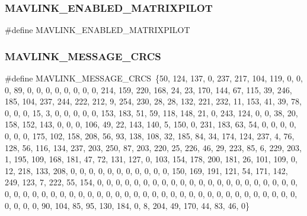\subsubsection{M\+A\+V\+L\+I\+N\+K\+\_\+\+E\+N\+A\+B\+L\+E\+D\+\_\+\+M\+A\+T\+R\+I\+X\+P\+I\+L\+OT}
{\footnotesize\ttfamily \#define M\+A\+V\+L\+I\+N\+K\+\_\+\+E\+N\+A\+B\+L\+E\+D\+\_\+\+M\+A\+T\+R\+I\+X\+P\+I\+L\+OT}

\mbox{\label{matrixpilot_8h_a3f709d5835acb54a11202a5fdc7a6bfe}} 
\subsubsection{M\+A\+V\+L\+I\+N\+K\+\_\+\+M\+E\+S\+S\+A\+G\+E\+\_\+\+C\+R\+CS}
{\footnotesize\ttfamily \#define M\+A\+V\+L\+I\+N\+K\+\_\+\+M\+E\+S\+S\+A\+G\+E\+\_\+\+C\+R\+CS~\{50, 124, 137, 0, 237, 217, 104, 119, 0, 0, 0, 89, 0, 0, 0, 0, 0, 0, 0, 0, 214, 159, 220, 168, 24, 23, 170, 144, 67, 115, 39, 246, 185, 104, 237, 244, 222, 212, 9, 254, 230, 28, 28, 132, 221, 232, 11, 153, 41, 39, 78, 0, 0, 0, 15, 3, 0, 0, 0, 0, 0, 153, 183, 51, 59, 118, 148, 21, 0, 243, 124, 0, 0, 38, 20, 158, 152, 143, 0, 0, 0, 106, 49, 22, 143, 140, 5, 150, 0, 231, 183, 63, 54, 0, 0, 0, 0, 0, 0, 0, 175, 102, 158, 208, 56, 93, 138, 108, 32, 185, 84, 34, 174, 124, 237, 4, 76, 128, 56, 116, 134, 237, 203, 250, 87, 203, 220, 25, 226, 46, 29, 223, 85, 6, 229, 203, 1, 195, 109, 168, 181, 47, 72, 131, 127, 0, 103, 154, 178, 200, 181, 26, 101, 109, 0, 12, 218, 133, 208, 0, 0, 0, 0, 0, 0, 0, 0, 0, 0, 0, 150, 169, 191, 121, 54, 171, 142, 249, 123, 7, 222, 55, 154, 0, 0, 0, 0, 0, 0, 0, 0, 0, 0, 0, 0, 0, 0, 0, 0, 0, 0, 0, 0, 0, 0, 0, 0, 0, 0, 0, 0, 0, 0, 0, 0, 0, 0, 0, 0, 0, 0, 0, 0, 0, 0, 0, 0, 0, 0, 0, 0, 0, 0, 0, 0, 0, 0, 0, 0, 0, 0, 90, 104, 85, 95, 130, 184, 0, 8, 204, 49, 170, 44, 83, 46, 0\}}

\mbox{\label{matrixpilot_8h_a384e37b2c133fdf33407436a982d2fb7}} 
